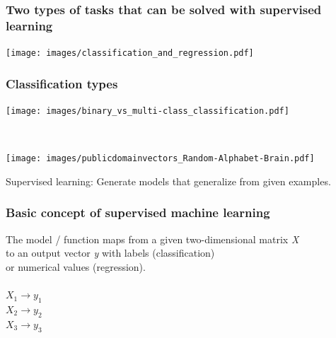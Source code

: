 \documentclass[aspectratio=169]{beamer}
\begin{document}
\begin{frame}{}
   \tableofcontents[currentsection]
\end{frame}

\begin{frame}
  \frametitle{Two types of tasks that can be solved with supervised learning}
  \begin{center}
    \texttt{[image: images/classification\_and\_regression.pdf]}
  \end{center}
\end{frame}

\begin{frame}
  \frametitle{Classification types}
  \begin{center}
    \texttt{[image: images/binary\_vs\_multi-class\_classification.pdf]}
  \end{center}  
\end{frame}


\begin{frame}
  \begin{block}{}
    \vspace{0.5cm}
    \ \ \ \
    \begin{minipage}{0.10\textwidth}
      \begin{center}
        \texttt{[image: images/publicdomainvectors\_Random-Alphabet-Brain.pdf]}
      \end{center}        
    \end{minipage}
    \hfill
    \begin{minipage}{0.80\textwidth}
      Supervised learning: Generate models that generalize from
      given examples.
    \end{minipage}
    \vspace{0.3cm}
  \end{block}
\end{frame}


\begin{frame}
  \frametitle{Basic concept of supervised machine learning}

  \begin{block}{}
      \begin{center}
        \vspace{0.5cm}
      The model / function maps from a given two-dimensional matrix \textit{X}\\
      to an output vector \textit{y} with labels (classification)\\ or numerical values (regression).\\
      \ \\
      
      $X_{1} \rightarrow y_{1}$\\
      $X_{2} \rightarrow y_{2}$\\
      $X_{3} \rightarrow y_{3}$\\

      \end{center}
    \end{block}
\end{frame}
\end{document}
